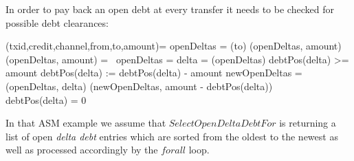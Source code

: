 In order to pay back an open debt at every transfer it needs to be checked for possible debt clearances:

\begin{asm}
	(txid,credit,channel,from,to,amount)=\+
		\LET openDeltas = (to)\+
			(openDeltas, amount)\dec\-
	\WHERE \+
		(openDeltas, amount) =\+
		\IF\ \NOT openDeltas = \emptyset \THEN\+
		\LET delta = (openDeltas)\+
			\IF debtPos(delta) >= amount \THEN\+
				debtPos(delta) := debtPos(delta) - amount\-
			\ELSE\+
				\LET newOpenDeltas = (openDeltas, delta)\+
					(newOpenDeltas, amount - debtPos(delta)) \SEQ\\
					debtPos(delta) = 0
\end{asm}

In that ASM example we assume that $SelectOpenDeltaDebtFor$ is returning a list of open \textit{delta debt} entries which are sorted from the oldest to the newest as well as processed accordingly by the $forall$ loop.